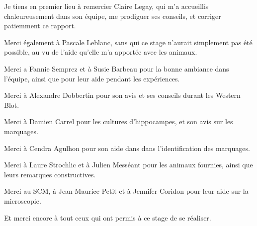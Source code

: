 Je tiens en premier lieu à remercier Claire Legay, qui m'a accueillis chaleureusement dans son équipe, me prodiguer ses conseils, et corriger patiemment ce rapport.

{\setlength{\parindent}{0cm}
Merci également à Pascale Leblanc, sans qui ce stage n'aurait simplement pas été possible, au vu de l'aide qu'elle m'a apportée avec les animaux.

Merci a Fannie Semprez et à Susie Barbeau pour la bonne ambiance dans l'équipe, ainsi que pour leur aide pendant les expériences.

Merci à Alexandre Dobbertin pour son avis et ses conseils durant les Western Blot.

Merci à Damien Carrel pour les cultures d'hippocampes, et son avis sur les marquages.

Merci à Cendra Agulhon pour son aide dans dans l'identification des marquages.

Merci à Laure Strochlic et à Julien Messéant pour les animaux fournies, ainsi que leurs remarques constructives.

Merci au SCM, à Jean-Maurice Petit et à Jennifer Coridon pour leur aide sur la microscopie.

Et merci encore à tout ceux qui ont permis à ce stage de se réaliser.}